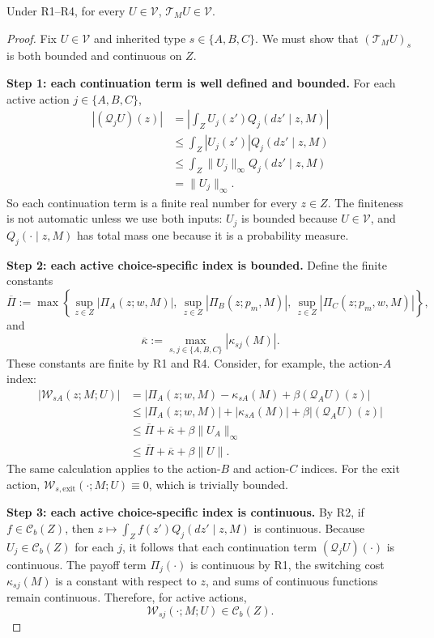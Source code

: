 \begin{lemma}
Under R1--R4, for every $U\in\mathcal V$, $\mathcal T_MU\in\mathcal V$.
\end{lemma}

\begin{proof}
Fix $U\in\mathcal V$ and inherited type $s\in\{A,B,C\}$. We must show that $(\mathcal T_MU)_s$ is both bounded and continuous on $Z$.

\medskip\noindent\textbf{Step 1: each continuation term is well defined and bounded.}
For each active action $j\in\{A,B,C\}$,
\begin{align*}
|(\mathcal Q_jU)(z)|
&=
\left|\int_Z U_j(z')Q_j(dz'\mid z,M)\right|\\
&\le
\int_Z |U_j(z')|Q_j(dz'\mid z,M)\\
&\le
\int_Z \|U_j\|_\infty Q_j(dz'\mid z,M)\\
&= 
\|U_j\|_\infty.
\end{align*}
So each continuation term is a finite real number for every $z\in Z$. The finiteness is not automatic unless we use both inputs: $U_j$ is bounded because $U\in\mathcal V$, and $Q_j(\cdot\mid z,M)$ has total mass one because it is a probability measure.

\medskip\noindent\textbf{Step 2: each active choice-specific index is bounded.}
Define the finite constants
\[
\overline \Pi
:=
\max\left\{
\sup_{z\in Z}|\Pi_A(z;w,M)|,\,
\sup_{z\in Z}|\Pi_B(z;p_m,M)|,\,
\sup_{z\in Z}|\Pi_C(z;p_m,w,M)|
\right\},
\]
and
\[
\overline \kappa
:=
\max_{s,j\in\{A,B,C\}}|\kappa_{sj}(M)|.
\]
These constants are finite by R1 and R4. Consider, for example, the action-$A$ index:
\begin{align*}
|\mathcal W_{sA}(z;M;U)|
&=
\left|\Pi_A(z;w,M)-\kappa_{sA}(M)+\beta(\mathcal Q_AU)(z)\right|\\
&\le
|\Pi_A(z;w,M)|+|\kappa_{sA}(M)|+\beta|(\mathcal Q_AU)(z)|\\
&\le
\overline \Pi+\overline \kappa+\beta\|U_A\|_\infty\\
&\le
\overline \Pi+\overline \kappa+\beta\|U\|.
\end{align*}
The same calculation applies to the action-$B$ and action-$C$ indices. For the exit action, $\mathcal W_{s,\mathrm{exit}}(\cdot;M;U)\equiv 0$, which is trivially bounded.

\medskip\noindent\textbf{Step 3: each active choice-specific index is continuous.}
By R2, if $f\in\mathcal C_b(Z)$, then $z\mapsto \int_Z f(z')Q_j(dz'\mid z,M)$ is continuous. Because $U_j\in\mathcal C_b(Z)$ for each $j$, it follows that each continuation term $(\mathcal Q_jU)(\cdot)$ is continuous. The payoff term $\Pi_j(\cdot)$ is continuous by R1, the switching cost $\kappa_{sj}(M)$ is a constant with respect to $z$, and sums of continuous functions remain continuous. Therefore, for active actions,
\[
\mathcal W_{sj}(\cdot;M;U)\in\mathcal C_b(Z).
\]


\end{proof}
